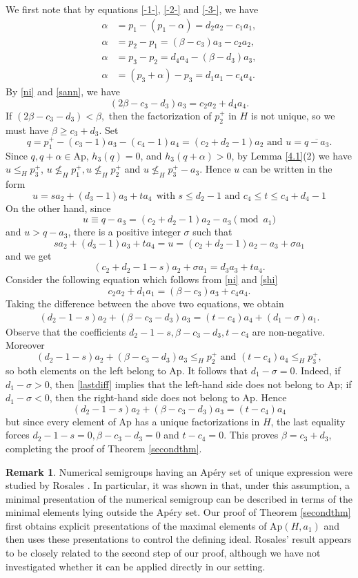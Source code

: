 \documentclass[12pt]{amsart}
\numberwithin{equation}{section}
\theoremstyle{definition}
\newtheorem{remark}[theorem]{Remark}
\newcommand{\Ap}{\mathrm{Ap}}
\begin{document}
We first note that by equations \eqref{-1-}, \eqref{-2-} and \eqref{-3-},
we have
\begin{align}
\label{iti}
\alpha&=p_1-(p_1-\alpha)=d_2a_2-c_1a_1,\\
\label{ni}
\alpha&=p_2-p_1=(\beta-c_3)a_3-c_2a_2,\\
\label{sann}
\alpha&=p_3-p_2=d_4a_4-(\beta-d_3)a_3,\\
\label{shi}
\alpha&=(p_3+\alpha)-p_3=d_1a_1-c_4a_4.
\end{align}
By \eqref{ni} and \eqref{sann},
we have
\[
(2\beta-c_3-d_3)a_3=c_2a_2+d_4a_4.
\]
If $(2\beta-c_3-d_3)<\beta,$ then the factorization of $p^+_2$ in $H$ is not unique, so we must have $\beta \geq c_3+d_3$.
Set
\[q=p_1^+-(c_3-1)a_3-(c_4-1)a_4=(c_2+d_2-1)a_2 \text{ and } u=\overline{q-a_3}.\]
Since $q,q+\alpha \in \Ap$, $h_3(q)=0$, and $h_3(q+\alpha)>0$,
by Lemma \ref{4.1}(2) we have $u \leq_H p_3^+$, $u \not \leq _H p^+_1, u \not \leq_H p^+_2$ and $u \not \leq_H p^+_3-a_3$.
Hence $u$ can be written in the form
\[
u=sa_2+(d_3-1)a_3+ta_4 \ \ \text{with } s\leq d_2-1 \text{ and } c_4 \leq t \leq c_4+d_4-1
\]
On the other hand, since
\[
u \equiv q-a_3=(c_2+d_2-1)a_2-a_3\pmod {a_1}
\]
and $u>q-a_3$,
there is a positive integer $\sigma$ such that
\[
sa_2+(d_3-1)a_3+ta_4=u=(c_2+d_2-1)a_2-a_3+\sigma a_1
\]
and we get
\[(c_2+d_2-1-s)a_2+\sigma a_1=d_3a_3+ta_4.
\]
Consider the following equation which follows from \eqref{ni} and \eqref{shi}
\[
c_2a_2+d_1a_1=(\beta-c_3)a_3+c_4a_4.
\]
Taking the difference between the above two equations, we obtain
\begin{align}
\label{lastdiff}
(d_2-1-s)a_2+(\beta-c_3-d_3)a_3=(t-c_4)a_4+(d_1-\sigma)a_1.
\end{align}
Observe that the coefficients $d_2-1-s,\beta-c_3-d_3,t-c_4$ are non-negative. Moreover
\[
(d_2-1-s)a_2+(\beta-c_3-d_3)a_3\leq_H p^+_2
\text{ and }
 (t-c_4)a_4 \leq_H p^+_3,
 \]
so both elements on the left belong to $\Ap$.
It follows that $d_1-\sigma=0$.
Indeed, if $d_1-\sigma>0$, then \eqref{lastdiff} implies that the
left-hand side does not belong to $\Ap$; if $d_1-\sigma<0$, then
the right-hand side does not belong to $\Ap$.
Hence
\[
(d_2-1-s)a_2+(\beta-c_3-d_3)a_3=(t-c_4)a_4
\]
but 
since every element of $\Ap$ has a unique factorizations in $H$,
the last equality forces
$d_2-1-s=0,\beta-c_3-d_3=0$ and $t-c_4=0$.
This proves $\beta=c_3+d_3$,
completing the proof of Theorem \ref{secondthm}.



\begin{remark}
Numerical semigroups having an Ap\'ery set of unique expression were studied by Rosales \cite{Rosales}. In particular, it was shown in \cite{Rosales} that, under this assumption, a minimal presentation of the numerical semigroup can be described in terms of the minimal elements lying outside the Ap\'ery set. Our proof of Theorem \ref{secondthm} first obtains explicit presentations of the maximal elements of $\Ap(H,a_1)$ and then uses these presentations to control the defining ideal. Rosales' result appears to be closely related to the second step of our proof, although we have not investigated whether it can be applied directly in our setting.
\end{remark}
\end{document}
